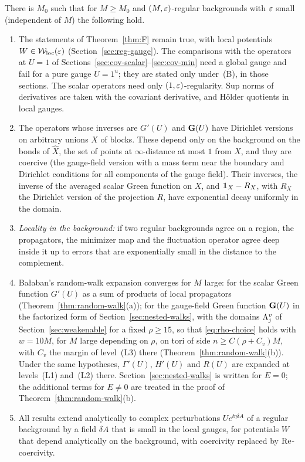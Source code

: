 \begin{maintheorem}\label{thm:G}
There is $M_0$ such that for $M\ge M_0$ and $(M,\varepsilon)$-regular backgrounds with $\varepsilon$ small (independent of $M$) the following hold.
\begin{enumerate}[label=(\roman*)]
\item The statements of Theorem~\ref{thm:F} remain true, with local potentials $W\in\mathcal W_{\rm loc}(\varepsilon)$ (Section~\ref{sec:reg-gauge}). The comparisons with the operators at $U=1$ of Sections~\ref{sec:cov-scalar}--\ref{sec:cov-min} need a global gauge and fail for a pure gauge $U=1^u$; they are stated only under~(B), in those sections. The scalar operators need only $(1,\varepsilon)$-regularity. Sup norms of derivatives are taken with the covariant derivative, and H\"older quotients in local gauges.
\item The operators whose inverses are $G'(U)$ and $\mathbf G(U)$ have Dirichlet versions on arbitrary unions $X$ of blocks. These depend only on the background on the bonds of $\hat X$, the set of points at $\infty$-distance at most $1$ from $X$, and they are coercive (the gauge-field version with a mass term near the boundary and Dirichlet conditions for all components of the gauge field). Their inverses, the inverse of the averaged scalar Green function on $X$, and $\mathbf 1_X-R_X$, with $R_X$ the Dirichlet version of the projection $R$, have exponential decay uniformly in the domain.
\item \emph{Locality in the background:} if two regular backgrounds agree on a region, the propagators, the minimizer map and the fluctuation operator agree deep inside it up to errors that are exponentially small in the distance to the complement.
\item Ba\l aban's random-walk expansion converges for $M$ large: for the scalar Green function $G'(U)$ as a sum of products of local propagators (Theorem~\ref{thm:random-walk}(a)); for the gauge-field Green function $\mathbf G(U)$ in the factorized form of Section~\ref{sec:nested-walks}, with the domains $\Lambda^v_j$ of Section~\ref{sec:weakenable} for a fixed $\rho\ge15$, so that \eqref{eq:rho-choice} holds with $w=10M$, for $M$ large depending on $\rho$, on tori of side $n\ge C(\rho+C_v)M$, with $C_v$ the margin of level~(L3) there (Theorem~\ref{thm:random-walk}(b)). Under the same hypotheses, $\Gamma'(U)$, $H'(U)$ and $R(U)$ are expanded at levels~(L1) and~(L2) there. Section~\ref{sec:nested-walks} is written for $E=0$; the additional terms for $E\ne0$ are treated in the proof of Theorem~\ref{thm:random-walk}(b).
\item All results extend analytically to complex perturbations $Ue^{\ii\eta\delta A}$ of a regular background by a field $\delta A$ that is small in the local gauges, for potentials $W$ that depend analytically on the background, with coercivity replaced by $\operatorname{Re}$-coercivity.
\end{enumerate}
\end{maintheorem}


